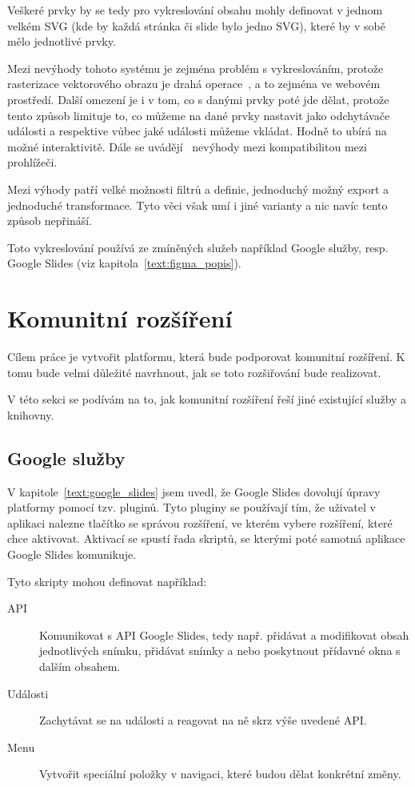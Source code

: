 Veškeré prvky by se tedy pro vykreslování obsahu mohly definovat v jednom velkém SVG (kde by každá stránka či slide bylo jedno SVG), které by v sobě mělo jednotlivé prvky.

Mezi nevýhody tohoto systému je zejména problém s vykreslováním, protože rasterizace vektorového obrazu je drahá operace~\cite{svg_css_html}, a to zejména ve webovém prostředí.
Další omezení je i v tom, co s danými prvky poté jde dělat, protože tento způsob limituje to, co můžeme na dané prvky nastavit jako odchytávače události a respektive vůbec jaké události můžeme vkládat.
Hodně to ubírá na možné interaktivitě.
Dále se uvádějí~\cite{svg_css_html} nevýhody mezi kompatibilitou mezi prohlížeči.

Mezi výhody patří velké možnosti filtrů a definic, jednoduchý možný export a jednoduché transformace.
Tyto věci však umí i jiné varianty a nic navíc tento způsob nepřináší.

Toto vykreslování používá ze zmíněných služeb například Google služby, resp. Google Slides (viz kapitola~\ref{text:figma_popis}).

\section{Komunitní rozšíření}\label{text:community_plugins}

Cílem práce je vytvořit platformu, která bude podporovat komunitní rozšíření.
K tomu bude velmi důležité navrhnout, jak se toto rozšiřování bude realizovat.

V této sekci se podívám na to, jak komunitní rozšíření řeší jiné existující služby a knihovny.

\subsection{Google služby}

V kapitole~\ref{text:google_slides} jsem uvedl, že Google Slides dovolují úpravy platformy pomocí tzv. pluginů.
Tyto pluginy se používají tím, že uživatel v aplikaci nalezne tlačítko se správou rozšíření, ve kterém vybere rozšíření, které chce aktivovat.
Aktivací se spustí řada skriptů, se kterými poté samotná aplikace Google Slides komunikuje.

Tyto skripty mohou definovat například:

\begin{description}
    \item[API] Komunikovat s API Google Slides, tedy např. přidávat a modifikovat obsah jednotlivých snímku, přidávat snímky a nebo poskytnout přídavné okna s dalším obsahem.
    \item[Události] Zachytávat se na události a reagovat na ně skrz výše uvedené API.
    \item[Menu] Vytvořit speciální položky v navigaci, které budou dělat konkrétní změny.
\end{description}

